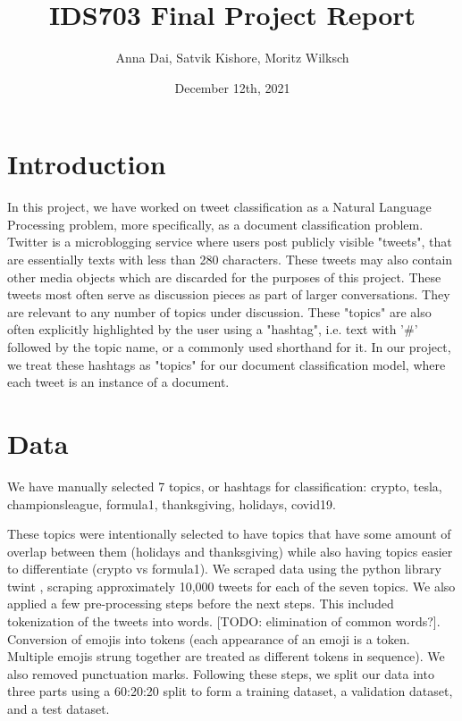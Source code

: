 \documentclass[11pt]{article}
\title{\vspace{-1.5cm}IDS703 Final Project Report}
\author{Anna Dai, Satvik Kishore, Moritz Wilksch}
\date{December 12th, 2021}
\begin{document}
\maketitle

\section{Introduction}

In this project, we have worked on tweet classification as a Natural Language Processing problem, more specifically, as a document classification problem. Twitter is a microblogging service where users post publicly visible "tweets", that are essentially texts with less than 280 characters. These tweets may also contain other media objects which are discarded for the purposes of this project. These tweets most often serve as discussion pieces as part of larger conversations. They are relevant to any number of topics under discussion. These "topics" are also often explicitly highlighted by the user using a "hashtag", i.e. text with '\#' followed by the topic name, or a commonly used shorthand for it. In our project, we treat these hashtags as "topics" for our document classification model, where each tweet is an instance of a document.

\section{Data}
We have manually selected 7 topics, or hashtags for classification: crypto, tesla, championsleague, formula1, thanksgiving, holidays, covid19.

These topics were intentionally selected to have topics that have some amount of overlap between them (holidays and thanksgiving) while also having topics easier to differentiate (crypto vs formula1). We scraped data using the python library twint \cite{twint}, scraping approximately 10,000 tweets for each of the seven topics. We also applied a few pre-processing steps before the next steps. This included tokenization of the tweets into words. [TODO: elimination of common words?]. Conversion of emojis into tokens (each appearance of an emoji is a token. Multiple emojis strung together are treated as different tokens in sequence). We also removed punctuation marks. Following these steps, we split our data into three parts using a 60:20:20 split to form a training dataset, a validation dataset, and a test dataset. 
\end{document}
